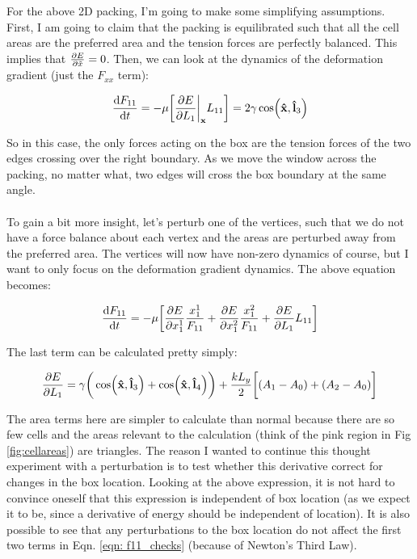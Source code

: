 \documentclass[12pt]{article}
\begin{document}
For the above 2D packing, I'm going to make some simplifying assumptions. First, I am going to claim that the packing is equilibrated such that all the cell areas are the preferred area and the tension forces are perfectly balanced. This implies that $\pdv{E}{\tilde{x}} = 0$. Then, we can look at the dynamics of the deformation gradient (just the $F_{xx}$ term):
\begin{center}
\begin{equation}
\dv{F_{11}}{t} = -\mu\bigg[\pdv{E}{L_1}\bigg\vert_{\vb{x}} L_{11}\bigg] = 2\gamma \cos(\vu{x}, \vu{l}_3)
\end{equation}
\end{center}
So in this case, the only forces acting on the box are the tension forces of the two edges crossing over the right boundary. As we move the window across the packing, no matter what, two edges will cross the box boundary at the same angle. \\ \\
To gain  a bit more insight, let's perturb one of the vertices, such that we do not have a force balance about each vertex and the areas are perturbed away from the preferred area. The vertices will now have non-zero dynamics of course, but I want to only focus on the deformation gradient dynamics. The above equation becomes:
\begin{center}
\begin{equation}
\label{eqn: f11_checks}
\dv{F_{11}}{t} = -\mu\bigg[\pdv{E}{x_1^1}\frac{x_1^1}{F_{11}} + \pdv{E}{x_1^2}\frac{x_1^2}{F_{11}} + \pdv{E}{L_1} L_{11} \bigg]
\end{equation}
\end{center}
The last term can be calculated pretty simply:
\begin{center}
\begin{equation}
\pdv{E}{L_1} = \gamma \bigg( \cos(\vu{x}, \vu{l}_3) + \cos(\vu{x}, \vu{l}_4)\bigg) + \frac{k L_y}{2} \bigg[ (A_1 - A_0) + (A_2 - A_0)\bigg]
\end{equation}
\end{center}
The area terms here are simpler to calculate than normal because there are so few cells and the areas relevant to the calculation (think of the pink region in Fig \ref{fig:cellareas}) are triangles. The reason I wanted to continue this thought experiment with a perturbation is to test whether this derivative correct for changes in the box location. Looking at the above expression, it is not hard to convince oneself that this expression is independent of box location (as we expect it to be, since a derivative of energy should be independent of location). It is also possible to see that any perturbations to the box location do not affect the first two terms in Eqn. \ref{eqn: f11_checks} (because of Newton's Third Law). \\ \\
\end{document}
